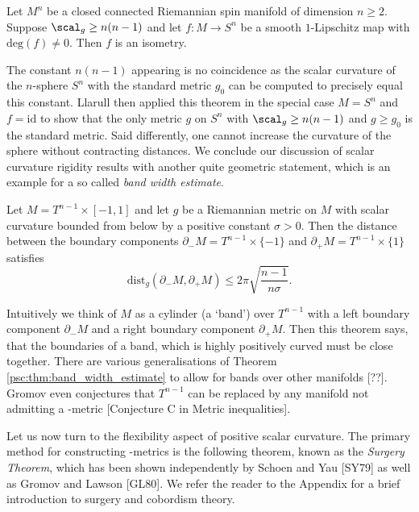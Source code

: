 \begin{theorem}[Llarull, 1998]
    Let $M^n$ be a closed connected Riemannian spin manifold of dimension $n \geq 2$. Suppose $\scal_g \geq n(n-1)$ and let $f\colon M \to S^n$ be a smooth $1$-Lipschitz map with $\mathrm{deg}(f) \neq 0$. Then $f$ is an isometry.
\end{theorem}

The constant $n(n-1)$ appearing is no coincidence as the scalar curvature of the $n$-sphere $S^n$ with the standard metric $g_0$ can be computed to precisely equal this constant. Llarull then applied this theorem in the special case $M = S^n$ and $f = \mathrm{id}$ to show that the only metric $g$ on $S^n$ with $\scal_g \geq n(n-1)$ and $g \geq g_0$ is the standard metric. Said differently, one cannot increase the curvature of the sphere without contracting distances. We conclude our discussion of scalar curvature rigidity results with another quite geometric statement, which is an example for a so called \textit{band width estimate}. 

\begin{theorem}[Gromov]
    \label{psc:thm:band_width_estimate}
    Let $M = T^{n-1} \times [-1,1]$ and let $g$ be a Riemannian metric on $M$ with scalar curvature bounded from below by a positive constant $\sigma > 0$. Then the distance between the boundary components $\partial_{-} M =T^{n-1} \times \{-1\}$ and $\partial_{+} M =T^{n-1} \times \{1\}$ satisfies
    \[
    \mathrm{dist}_g(\partial_{-}M, \partial_{+}M) \leq 2 \pi \sqrt{\frac{n-1}{n\sigma}}.
    \]
\end{theorem}

Intuitively we think of $M$ as a cylinder (a `band') over $T^{n-1}$ with a left boundary component $\partial_{-} M$ and a right boundary component $\partial_{+} M$. Then this theorem says, that the boundaries of a band, which is highly positively curved must be close together. There are various generalisations of Theorem \ref{psc:thm:band_width_estimate} to allow for bands over other manifolds [??]. Gromov even conjectures that $T^{n-1}$ can be replaced by any manifold not admitting a \psc-metric [Conjecture C in Metric inequalities].

Let us now turn to the flexibility aspect of positive scalar curvature. The primary method for constructing \psc-metrics is the following theorem, known as the \textit{Surgery Theorem}, which has been shown independently by Schoen and Yau [SY79] as well as Gromov and Lawson [GL80]. We refer the reader to the Appendix for a brief introduction to surgery and cobordism theory.

